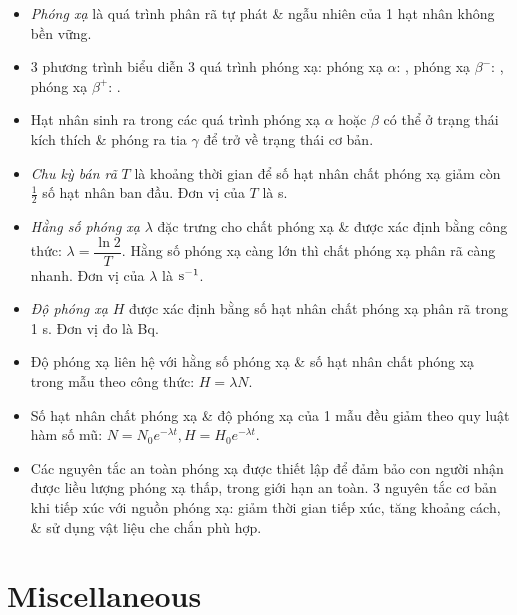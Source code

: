 \documentclass{article}
\begin{document}
\begin{itemize}
	\item {\it Phóng xạ} là quá trình phân rã tự phát \& ngẫu nhiên của 1 hạt nhân không bền vững.
	\item 3 phương trình biểu diễn 3 quá trình phóng xạ: phóng xạ $\alpha$: , phóng xạ $\beta^-$: , phóng xạ $\beta^+$: .
	\item Hạt nhân sinh ra trong các quá trình phóng xạ $\alpha$ hoặc $\beta$ có thể ở trạng thái kích thích \& phóng ra tia $\gamma$ để trở về trạng thái cơ bản.
	\item {\it Chu kỳ bán rã} $T$ là khoảng thời gian để số hạt nhân chất phóng xạ giảm còn $\frac{1}{2}$ số hạt nhân ban đầu. Đơn vị của $T$ là s.
	\item {\it Hằng số phóng xạ} $\lambda$ đặc trưng cho chất phóng xạ \& được xác định bằng công thức: $\lambda = \dfrac{\ln2}{T}$. Hằng số phóng xạ càng lớn thì chất phóng xạ phân rã càng nhanh. Đơn vị của $\lambda$ là $\rm s^{-1}$.
	\item {\it Độ phóng xạ} $H$ được xác định bằng số hạt nhân chất phóng xạ phân rã trong 1 s. Đơn vị đo là Bq.
	\item Độ phóng xạ liên hệ với hằng số phóng xạ \& số hạt nhân chất phóng xạ trong mẫu theo công thức: $H = \lambda N$.
	\item Số hạt nhân chất phóng xạ \& độ phóng xạ của 1 mẫu đều giảm theo quy luật hàm số mũ: $N = N_0e^{-\lambda t},H = H_0e^{-\lambda t}$.
	\item Các nguyên tắc an toàn phóng xạ được thiết lập để đảm bảo con người nhận được liều lượng phóng xạ thấp, trong giới hạn an toàn. 3 nguyên tắc cơ bản khi tiếp xúc với nguồn phóng xạ: giảm thời gian tiếp xúc, tăng khoảng cách, \& sử dụng vật liệu che chắn phù hợp.
\end{itemize}


\section{Miscellaneous}


\printbibliography[heading=bibintoc]
	
\end{document}
